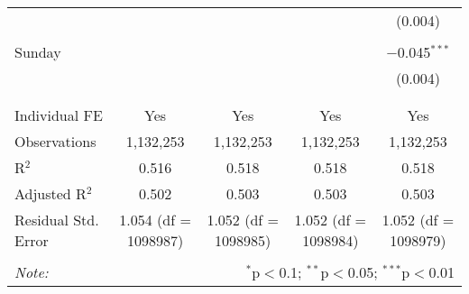 \documentclass[
]{article}
\begin{document}
\begin{table}[!htbp]
{\begin{tabular}{@{\extracolsep{5pt}}lcccc}
  &  &  &  & (0.004) \\ 
  & & & & \\ 
 Sunday &  &  &  & $-$0.045$^{***}$ \\ 
  &  &  &  & (0.004) \\ 
  & & & & \\ 
\hline \\[-1.8ex] 
Individual FE & Yes & Yes & Yes & Yes \\ 
Observations & 1,132,253 & 1,132,253 & 1,132,253 & 1,132,253 \\ 
R$^{2}$ & 0.516 & 0.518 & 0.518 & 0.518 \\ 
Adjusted R$^{2}$ & 0.502 & 0.503 & 0.503 & 0.503 \\ 
Residual Std. Error & 1.054 (df = 1098987) & 1.052 (df = 1098985) & 1.052 (df = 1098984) & 1.052 (df = 1098979) \\ 
\hline 
\hline \\[-1.8ex] 
\textit{Note:}  & \multicolumn{4}{r}{$^{*}$p$<$0.1; $^{**}$p$<$0.05; $^{***}$p$<$0.01} \\ 
\end{tabular}
} 
\end{table} 
\newpage
\end{document}

